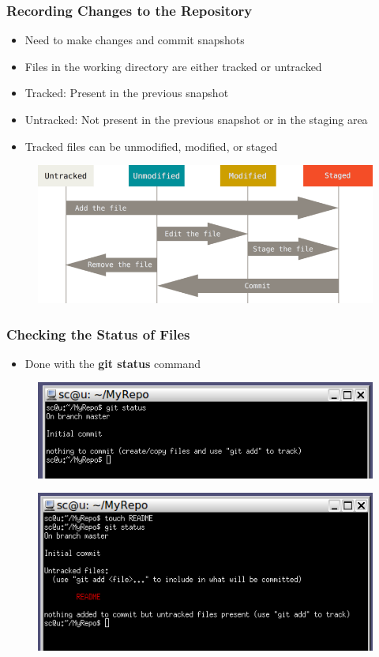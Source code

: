 \documentclass{beamer}
\begin{document}
\begin{frame}
	\frametitle{Recording Changes to the Repository}
	\begin{itemize}
		\item{Need to make changes and commit snapshots}
		\item{Files in the working directory are either tracked or untracked}
		\item{Tracked: Present in the previous snapshot}
		\item{Untracked: Not present in the previous snapshot or in the staging area}
		\item{Tracked files can be unmodified, modified, or staged}
	\end{itemize}
	\begin{figure}
		\includegraphics[scale=0.37]{Recording_Changes_to_the_Repository-0.png}
	\end{figure}
\end{frame}

\begin{frame}
	\frametitle{Checking the Status of Files}
	\begin{itemize}
		\item{Done with the \textbf{git status} command}
	\end{itemize}
	\begin{figure}
		\includegraphics[scale=0.50]{Checking_the_Status_of_Files-0.png}
	\end{figure}
	\begin{figure}
		\includegraphics[scale=0.50]{Checking_the_Status_of_Files-1.png}
	\end{figure}
\end{frame}
\end{document}
